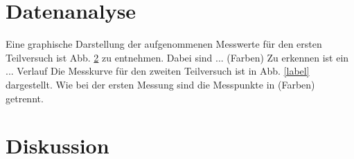 \section{Datenanalyse}
			
	Eine graphische Darstellung der aufgenommenen Messwerte für den ersten Teilversuch ist Abb. \ref{} zu entnehmen.
	Dabei sind ... (Farben)
	Zu erkennen ist ein ... Verlauf
	Die Messkurve für den zweiten Teilversuch ist in Abb. \ref{label} dargestellt.
	Wie bei der ersten Messung sind die Messpunkte in (Farben) getrennt.
			
\section{Diskussion}
			
